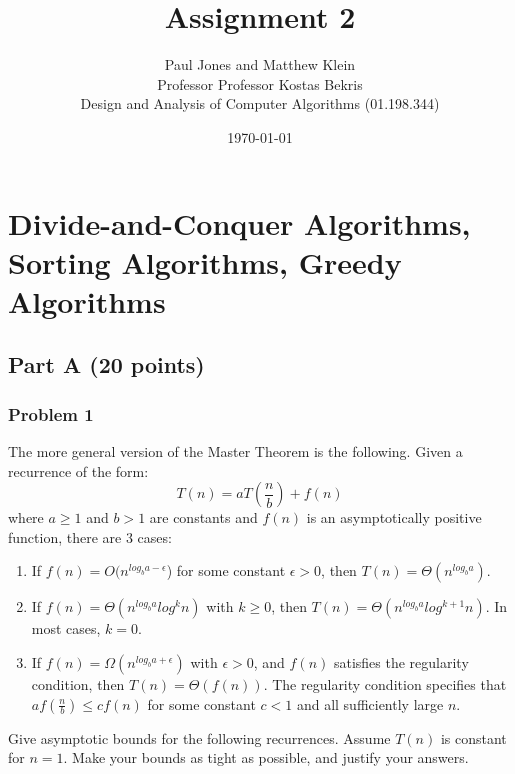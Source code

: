 \documentclass[11pt]{article}
\title{Assignment 2}
\author{Paul Jones and Matthew Klein \\
		Professor Professor Kostas Bekris\\
		Design and Analysis of Computer Algorithms (01.198.344)}
\date{\today}
\begin{document}
\maketitle

\pagebreak

\section*{Divide-and-Conquer Algorithms, Sorting Algorithms, Greedy Algorithms}


\subsection*{Part A (20 points)}

\subsubsection*{Problem 1}

The more general version of the Master
Theorem is the following. Given a recurrence of the form: 
$$T(n) = a T\left(\frac{n}{b}\right) + f(n)$$
where $a \geq 1$ and $b > 1$ are constants and $f(n)$ is an
asymptotically positive function, there are 3 cases: 
\begin{enumerate}
\item If $f(n) = O(n^{log_ba - \epsilon}$) for some constant $\epsilon
  > 0$, then $T(n) = \Theta(n^{log_ba})$.
\item If $f(n) = \Theta(n^{log_ba} log^kn)$ with $k \geq 0$, then
  $T(n) = \Theta(n^{log_ba} log^{k+1}n)$. In most cases, $k = 0$.
\item If $f(n) = \Omega(n^{log_ba+\epsilon})$ with $\epsilon > 0$, and
  $f(n)$ satisfies the regularity condition, then $T(n) = \Theta( f(n)
  )$. The regularity condition specifies that $a f(\frac{n}{b}) \leq c
  f(n)$ for some constant $c < 1$ and all sufficiently large $n$.
\end{enumerate}

\noindent Give asymptotic bounds for the following recurrences. Assume
$T(n)$ is constant for $n = 1$. Make your bounds as tight as possible,
and justify your answers.\\
\end{document}
